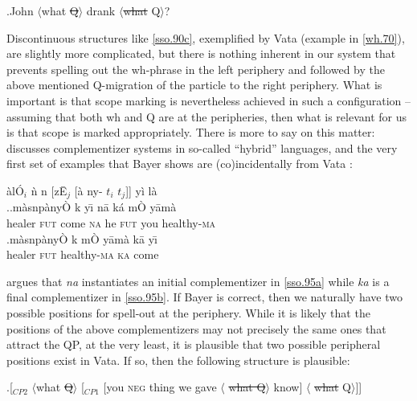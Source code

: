 \documentclass[charis]{glossa}
\begin{document}
\ex.\label{sso.94}John $\langle$what \sout{Q}$\rangle$ drank $\langle$\sout{what } Q$\rangle$?

Discontinuous structures like \ref{sso.90c}, exemplified by Vata (example in \ref{wh.70}), are slightly more complicated, but there is nothing inherent in our system that prevents spelling out the wh-phrase in the left periphery and followed by the above mentioned Q-migration of the particle to the right periphery. What is important is that scope marking is nevertheless achieved in such a configuration -- assuming that both wh and Q are at the peripheries, then what is relevant for us is that scope is marked appropriately. There is more to say on this matter: \cite{bayer:1999} discusses complementizer systems in so-called ``hybrid'' languages, and the very first set of examples that Bayer shows are (co)incidentally from Vata \citep{koopman:1984}:

\`al\'O$_i$ \`n n{} [z\={E}$_j$ [\`a ny{}-{} $t_i$ $t_j$]] y\`i l\`a\\

\ex.\ag.\label{sso.95a}m\`asn{}p\`any\`O k{} y\={\i} n\=a {} k\'a m\`O y\=am\`a\\
   healer \textsc{fut} come \textsc{na} he \textsc{fut} you healthy-\textsc{ma} \\
    \bg.\label{sso.95b}m\`asn{}p\`any\`O k{} m\`O y\=am\`a k\=a y\={\i} \\
   healer \textsc{fut} healthy-\textsc{ma} \textsc{ka} come \\

\cite{bayer:1999} argues that \textit{na} instantiates an initial complementizer in \ref{sso.95a} while \textit{ka} is a final complementizer in \ref{sso.95b}. If Bayer is correct, then we naturally have two possible positions for spell-out at the periphery. While it is likely that the positions of the above complementizers may not precisely the same ones that attract the QP, at the very least, it is plausible that two possible peripheral positions exist in Vata. If so, then the following structure is plausible:

\ex.\label{sso.96}[$_{CP2}$ $\langle$what \sout{Q}$\rangle$ [$_{CP1}$ [you \textsc{neg} thing we gave $\langle$ \sout{what Q}$\rangle$ know] $\langle$ \sout{what} Q$\rangle$]]
\end{document}

